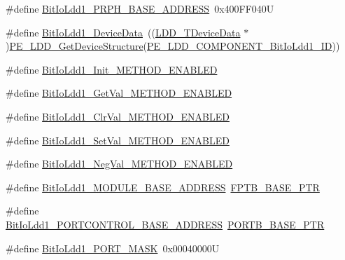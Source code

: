 \begin{DoxyCompactItemize}
\item 
\#define \hyperlink{group___bit_io_ldd1__module_gaf1c1ab314890f91862048712f6ee0270}{Bit\+Io\+Ldd1\+\_\+\+P\+R\+P\+H\+\_\+\+B\+A\+S\+E\+\_\+\+A\+D\+D\+R\+E\+SS}~0x400\+F\+F040U
\item 
\#define \hyperlink{group___bit_io_ldd1__module_ga87620b3d6d232d352b6cd29d865efc18}{Bit\+Io\+Ldd1\+\_\+\+Device\+Data}~((\hyperlink{group___p_e___types__module_gac5cf1362f1f0e3a2ce71b1bf2276d091}{L\+D\+D\+\_\+\+T\+Device\+Data} $\ast$)\hyperlink{group___p_e___types__module_gaa1c23d559daef5bcd3327ca83fb56f5a}{P\+E\+\_\+\+L\+D\+D\+\_\+\+Get\+Device\+Structure}(\hyperlink{group___p_e___types__module_gaf065465c0e631eda1ba76134006757e0}{P\+E\+\_\+\+L\+D\+D\+\_\+\+C\+O\+M\+P\+O\+N\+E\+N\+T\+\_\+\+Bit\+Io\+Ldd1\+\_\+\+ID}))
\item 
\#define \hyperlink{group___bit_io_ldd1__module_ga7769c2e2e3019fc5591e23fcf27a8c4b}{Bit\+Io\+Ldd1\+\_\+\+Init\+\_\+\+M\+E\+T\+H\+O\+D\+\_\+\+E\+N\+A\+B\+L\+ED}
\item 
\#define \hyperlink{group___bit_io_ldd1__module_gaaa7f001641722363891cc905632a195c}{Bit\+Io\+Ldd1\+\_\+\+Get\+Val\+\_\+\+M\+E\+T\+H\+O\+D\+\_\+\+E\+N\+A\+B\+L\+ED}
\item 
\#define \hyperlink{group___bit_io_ldd1__module_gad93237ef8b0ff5074e33422fa91fff9c}{Bit\+Io\+Ldd1\+\_\+\+Clr\+Val\+\_\+\+M\+E\+T\+H\+O\+D\+\_\+\+E\+N\+A\+B\+L\+ED}
\item 
\#define \hyperlink{group___bit_io_ldd1__module_gad7a2f5495de140ff4604048a384dc210}{Bit\+Io\+Ldd1\+\_\+\+Set\+Val\+\_\+\+M\+E\+T\+H\+O\+D\+\_\+\+E\+N\+A\+B\+L\+ED}
\item 
\#define \hyperlink{group___bit_io_ldd1__module_ga1d093a327710f88ad84d1e5b23de50c1}{Bit\+Io\+Ldd1\+\_\+\+Neg\+Val\+\_\+\+M\+E\+T\+H\+O\+D\+\_\+\+E\+N\+A\+B\+L\+ED}
\item 
\#define \hyperlink{group___bit_io_ldd1__module_ga37d85f4c3dfac62a113e7fbc733c6ec1}{Bit\+Io\+Ldd1\+\_\+\+M\+O\+D\+U\+L\+E\+\_\+\+B\+A\+S\+E\+\_\+\+A\+D\+D\+R\+E\+SS}~\hyperlink{group___backward___compatibility___symbols_ga725ec21a43213bffe0aa484f7406bcf5}{F\+P\+T\+B\+\_\+\+B\+A\+S\+E\+\_\+\+P\+TR}
\item 
\#define \hyperlink{group___bit_io_ldd1__module_gaaba32f43815123de9da736bfa1c2d593}{Bit\+Io\+Ldd1\+\_\+\+P\+O\+R\+T\+C\+O\+N\+T\+R\+O\+L\+\_\+\+B\+A\+S\+E\+\_\+\+A\+D\+D\+R\+E\+SS}~\hyperlink{group___p_o_r_t___peripheral_ga585b4782d1ceb44492289af0019480f9}{P\+O\+R\+T\+B\+\_\+\+B\+A\+S\+E\+\_\+\+P\+TR}
\item 
\#define \hyperlink{group___bit_io_ldd1__module_ga5a1122093477fddb4e3686d1410cbb46}{Bit\+Io\+Ldd1\+\_\+\+P\+O\+R\+T\+\_\+\+M\+A\+SK}~0x00040000U
\end{DoxyCompactItemize}
